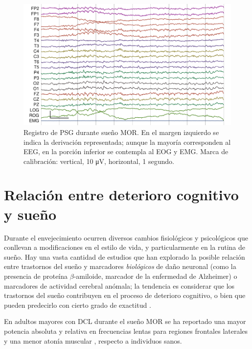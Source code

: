 \documentclass[12pt,letterpaper]{book}
\newcommand{\mv}{\si{\micro\volt}\xspace}
\begin{document}
\begin{figure}
\centering
\includegraphics[width=.92\linewidth]
{./img_ejemplos/MJNN_epoca_stam.pdf}
\caption[Registro de polisomnograma durante sueño MOR]
{Registro de PSG durante sueño MOR. En el margen izquierdo se indica la derivación representada; aunque la mayoría corresponden al EEG, en la porción inferior se contempla al EOG y EMG.
Marca de calibración: vertical, 10 \mv, horizontal, 1 segundo.}
\label{ejemplos_mor}
\end{figure}


\section{Relación entre deterioro cognitivo y sueño}
\label{sec:pdcl_sueno}

Durante el envejecimiento ocurren diversos cambios fisiológicos y psicológicos que conllevan a modificaciones en el estilo de vida, y particularmente en la rutina de sueño.
%
Hay una vasta cantidad de estudios que han explorado la posible relación entre trastornos del sueño y marcadores \textit{biológicos} de daño neuronal (como la presencia de proteína $\beta$-amiloide, marcador de la enfermedad de Alzheimer) o marcadores de actividad cerebral anómala; la tendencia es considerar que los trastornos del sueño contribuyen en el proceso de deterioro cognitivo, o bien que pueden predecirlo con cierto grado de exactitud \cite{porter15}.

En adultos mayores con DCL durante el sueño MOR se ha reportado una mayor potencia absoluta y relativa en frecuencias lentas para regiones frontales laterales \cite{Brayet16} y una menor atonía muscular \cite{Chen}, respecto a individuos sanos.
\end{document}
